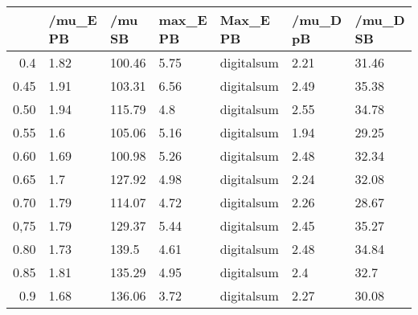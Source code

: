 \begin{table}[ht]
\centering
\begin{tabular}{rllllll}
  \hline
 & /mu\_E PB & /mu SB & max\_E PB & Max\_E PB & /mu\_D pB & /mu\_D SB \\ 
  \hline
0.4 & 1.82 & 100.46 & 5.75 & digitalsum & 2.21 & 31.46 \\ 
  0.45 & 1.91 & 103.31 & 6.56 & digitalsum & 2.49 & 35.38 \\ 
  0.50 & 1.94 & 115.79 & 4.8 & digitalsum & 2.55 & 34.78 \\ 
  0.55 & 1.6 & 105.06 & 5.16 & digitalsum & 1.94 & 29.25 \\ 
  0.60 & 1.69 & 100.98 & 5.26 & digitalsum & 2.48 & 32.34 \\ 
  0.65 & 1.7 & 127.92 & 4.98 & digitalsum & 2.24 & 32.08 \\ 
  0.70 & 1.79 & 114.07 & 4.72 & digitalsum & 2.26 & 28.67 \\ 
  0,75 & 1.79 & 129.37 & 5.44 & digitalsum & 2.45 & 35.27 \\ 
  0.80 & 1.73 & 139.5 & 4.61 & digitalsum & 2.48 & 34.84 \\ 
  0.85 & 1.81 & 135.29 & 4.95 & digitalsum & 2.4 & 32.7 \\ 
  0.9 & 1.68 & 136.06 & 3.72 & digitalsum & 2.27 & 30.08 \\ 
   \hline
\end{tabular}
\end{table}

